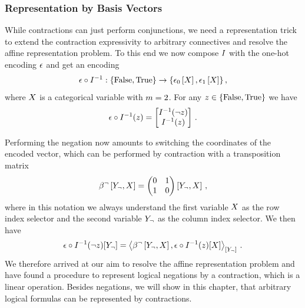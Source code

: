 \subsubsection{Representation by Basis Vectors} %

While contractions can just perform conjunctions, we need a representation trick to extend the contraction expressivity to arbitrary connectives and resolve the affine representation problem.
To this end we now compose $I$ with the one-hot encoding $\epsilon$ and get an encoding
\begin{align*}
    \epsilon\circ I^{-1} : \{\mathrm{False},\mathrm{True}\} \rightarrow \{\epsilon_{0}\left[X\right],\epsilon_{1}\left[X\right]\} \, ,
\end{align*}
where $X$ is a categorical variable with $m=2$.
For any $z\in\{\mathrm{False},\mathrm{True}\}$ we have
\begin{align*}
    \epsilon\circ I^{-1}(z) =
    \begin{bmatrix}
        I^{-1}(\lnot z) \\
        I^{-1}(z)
    \end{bmatrix}  \, .
\end{align*}


Performing the negation now amounts to switching the coordinates of the encoded vector, which can be performed by contraction with a transposition matrix
\begin{align*}
    \bencodingofat{\lnot}{\headvariableof{\lnot},\catvariable} =
    \coloredmatrixof{0 & 1 \\ 1 & 0}{\headvariableof{\lnot},\catvariable} \, ,
\end{align*}
where in this notation we always understand the first variable $X$ as the row index selector and the second variable $Y_{\lnot}$ as the column index selector.
We then have
\begin{align*}
    \onehotmap\circ\invindexinterpretationat{\lnot\truthstate}[\headvariableof{\lnot}]
    = \contractionof{\bencodingofat{\notucon}{\headvariableof{\notucon},\catvariable},\onehotmap\circ\invindexinterpretationat{\truthstate}[\catvariable]}{\headvariableof{\notucon}} \, .
\end{align*}
We therefore arrived at our aim to resolve the affine representation problem and have found a procedure to represent logical negations by a contraction, which is a linear operation.
Besides negations, we will show in this chapter, that arbitrary logical formulas can be represented by contractions.

